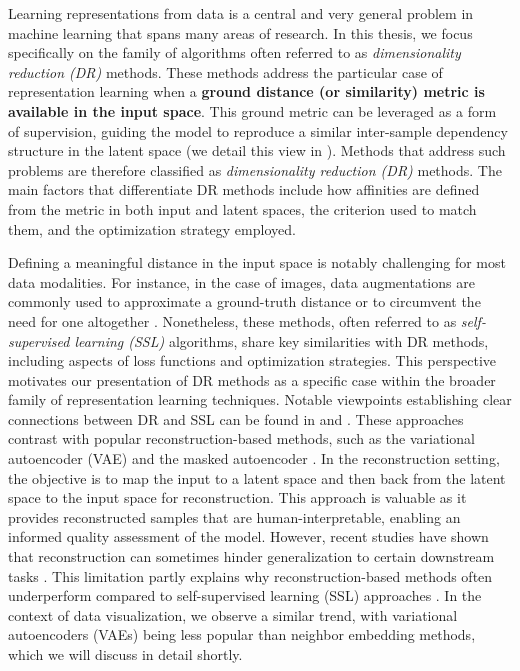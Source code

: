 Learning representations from data is a central and very general problem in machine learning that spans many areas of research. In this thesis, we focus specifically on the family of algorithms often referred to as \emph{dimensionality reduction (DR)} methods. These methods address the particular case of representation learning when a \textbf{ground distance (or similarity) metric is available in the input space}. This ground metric can be leveraged as a form of supervision, guiding the model to reproduce a similar inter-sample dependency structure in the latent space (we detail this view in ). Methods that address such problems are therefore classified as \emph{dimensionality reduction (DR)} methods. The main factors that differentiate DR methods include how affinities are defined from the metric in both input and latent spaces, the criterion used to match them, and the optimization strategy employed. 

Defining a meaningful distance in the input space is notably challenging for most data modalities. For instance, in the case of images, data augmentations are commonly used to approximate a ground-truth distance or to circumvent the need for one altogether \citep{chen2020simple}. Nonetheless, these methods, often referred to as \emph{self-supervised learning (SSL)} algorithms, share key similarities with DR methods, including aspects of loss functions and optimization strategies. This perspective motivates our presentation of DR methods as a specific case within the broader family of representation learning techniques. Notable viewpoints establishing clear connections between DR and SSL can be found in \citep{balestriero2022contrastive} and \citep{tan2023contrastive}. These approaches contrast with popular reconstruction-based methods, such as the variational autoencoder (VAE) \citep{kingma2013auto} and the masked autoencoder \citep{he2022masked}. In the reconstruction setting, the objective is to map the input to a latent space and then back from the latent space to the input space for reconstruction. This approach is valuable as it provides reconstructed samples that are human-interpretable, enabling an informed quality assessment of the model. However, recent studies have shown that reconstruction can sometimes hinder generalization to certain downstream tasks \citep{balestriero2024learning}. This limitation partly explains why reconstruction-based methods often underperform compared to self-supervised learning (SSL) approaches \citep{otero2024self}.
In the context of data visualization, we observe a similar trend, with variational autoencoders (VAEs) being less popular than neighbor embedding methods, which we will discuss in detail shortly.

